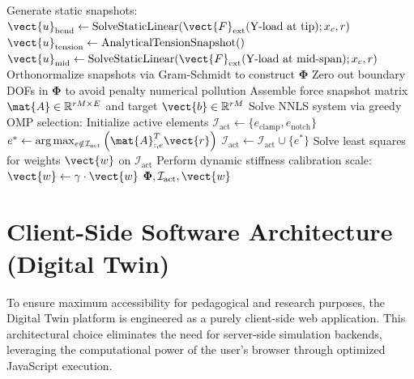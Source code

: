 \begin{algorithm}[htbp]
\caption{Offline ECSW Training and Reduced Basis Generation}
\label{alg:ecsw_training}
\begin{algorithmic}[1]
    \State Generate static snapshots:
    \State $\vect{u}_{\text{bend}} \gets \text{SolveStaticLinear}(\vect{F}_{\text{ext}}(\text{Y-load at tip}); x_c, r)$
    \State $\vect{u}_{\text{tension}} \gets \text{AnalyticalTensionSnapshot}()$
    \State $\vect{u}_{\text{mid}} \gets \text{SolveStaticLinear}(\vect{F}_{\text{ext}}(\text{Y-load at mid-span}); x_c, r)$
    \State Orthonormalize snapshots via Gram-Schmidt to construct $\boldsymbol{\Phi}$
    \State Zero out boundary DOFs in $\boldsymbol{\Phi}$ to avoid penalty numerical pollution
    \State Assemble force snapshot matrix $\mat{A} \in \mathbb{R}^{rM \times E}$ and target $\vect{b} \in \mathbb{R}^{rM}$
    \State Solve NNLS system via greedy OMP selection:
    \State Initialize active elements $\mathcal{I}_{\text{act}} \gets \{e_{\text{clamp}}, e_{\text{notch}}\}$
        \State $e^* \gets \arg\max_{e \notin \mathcal{I}_{\text{act}}} \left( \mat{A}_{:, e}^T \vect{r} \right)$
        \State $\mathcal{I}_{\text{act}} \gets \mathcal{I}_{\text{act}} \cup \{e^*\}$
        \State Solve least squares for weights $\vect{w}$ on $\mathcal{I}_{\text{act}}$
    \EndWhile
    \State Perform dynamic stiffness calibration scale: $\vect{w} \gets \gamma \cdot \vect{w}$
    \State \Return $\boldsymbol{\Phi}, \mathcal{I}_{\text{act}}, \vect{w}$
\EndProcedure
\end{algorithmic}
\end{algorithm}
\section{Client-Side Software Architecture (Digital Twin)} \label{sec:mvc}
To ensure maximum accessibility for pedagogical and research purposes, the Digital Twin platform is engineered as a purely client-side web application. This architectural choice eliminates the need for server-side simulation backends, leveraging the computational power of the user's browser through optimized JavaScript execution.

